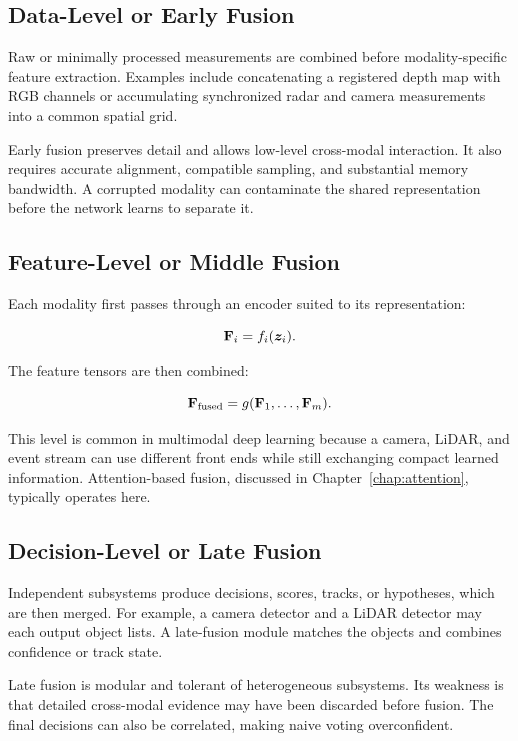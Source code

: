 \subsection{Data-Level or Early Fusion}

Raw or minimally processed measurements are combined before modality-specific feature extraction. Examples include concatenating a registered depth map with RGB channels or accumulating synchronized radar and camera measurements into a common spatial grid.

Early fusion preserves detail and allows low-level cross-modal interaction. It also requires accurate alignment, compatible sampling, and substantial memory bandwidth. A corrupted modality can contaminate the shared representation before the network learns to separate it.

\subsection{Feature-Level or Middle Fusion}

Each modality first passes through an encoder suited to its representation:

\[
    \mathbf{F}_i = f_i(\bm{z}_i).
\]

The feature tensors are then combined:

\[
    \mathbf{F}_{\text{fused}} = g(\mathbf{F}_1,\ldots,\mathbf{F}_m).
\]

This level is common in multimodal deep learning because a camera, LiDAR, and event stream can use different front ends while still exchanging compact learned information. Attention-based fusion, discussed in Chapter~\ref{chap:attention}, typically operates here.

\subsection{Decision-Level or Late Fusion}

Independent subsystems produce decisions, scores, tracks, or hypotheses, which are then merged. For example, a camera detector and a LiDAR detector may each output object lists. A late-fusion module matches the objects and combines confidence or track state.

Late fusion is modular and tolerant of heterogeneous subsystems. Its weakness is that detailed cross-modal evidence may have been discarded before fusion. The final decisions can also be correlated, making naive voting overconfident.

